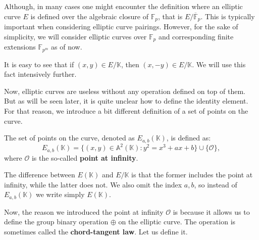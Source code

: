 \documentclass[../lecture-notes.tex]{subfiles}
\begin{document}
\begin{remark}
    Although, in many cases one might encounter the definition where an elliptic curve $E$ is defined over the algebraic closure of $\mathbb{F}_p$, that is $E/\overline{\mathbb{F}}_p$. This is typically important when considering elliptic curve pairings. However, for the sake of simplicity, we will consider elliptic curves over $\mathbb{F}_p$ and corresponding finite extensions $\mathbb{F}_{p^m}$ as of now.
\end{remark}

\begin{remark}
    It is easy to see that if $(x,y) \in E/\mathbb{K}$, then $(x,-y) \in E/\mathbb{K}$. We will use this fact intensively further.
\end{remark}

Now, elliptic curves are useless without any operation defined on top of them. But as will be seen later, it is quite unclear how to define the identity element. For that reason, we introduce a bit different definition of a set of points on the curve.

\begin{definition}
    The set of points on the curve, denoted as $E_{a,b}(\mathbb{K})$, is defined as:
    \begin{equation}
        E_{a,b}(\mathbb{K}) = \{(x,y) \in \mathbb{A}^2(\mathbb{K}): y^2=x^3+ax+b\} \cup \{\mathcal{O}\},
    \end{equation}
    where $\mathcal{O}$ is the so-called \textbf{point at infinity}.
\end{definition}

\begin{remark}
    The difference between $E(\mathbb{K})$ and $E/\mathbb{K}$ is that the former includes the point at infinity, while the latter does not. We also omit the index $a,b$, so instead of $E_{a,b}(\mathbb{K})$ we write simply $E(\mathbb{K})$.
\end{remark}

Now, the reason we introduced the point at infinity $\mathcal{O}$ is because it allows us to define the group binary operation $\oplus$ on the elliptic curve. The operation is sometimes called the \textbf{chord-tangent law}. Let us define it.
\end{document}
